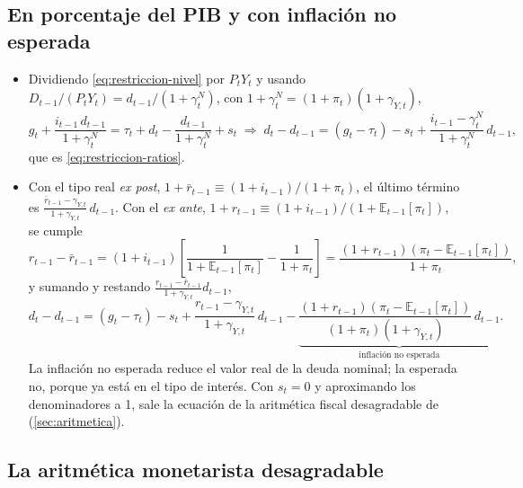 \documentclass[11pt]{article}
\begin{document}
\subsection{En porcentaje del PIB y con inflación no esperada}

\begin{itemize}
\item Dividiendo \eqref{eq:restriccion-nivel} por $P_tY_t$ y usando $D_{t-1}/(P_tY_t)=d_{t-1}/(1+\gamma^N_t)$, con $1+\gamma^N_t=(1+\pi_t)(1+\gamma_{Y,t})$,
  \begin{equation*}
  g_t+\frac{i_{t-1}\,d_{t-1}}{1+\gamma^N_t}=\tau_t+d_t-\frac{d_{t-1}}{1+\gamma^N_t}+s_t\;\Longrightarrow\;d_t-d_{t-1}=(g_t-\tau_t)-s_t+\frac{i_{t-1}-\gamma^N_t}{1+\gamma^N_t}\,d_{t-1},
  \end{equation*}
  que es \eqref{eq:restriccion-ratios}.
\item Con el tipo real \emph{ex post}, $1+\bar r_{t-1}\equiv(1+i_{t-1})/(1+\pi_t)$, el último término es $\frac{\bar r_{t-1}-\gamma_{Y,t}}{1+\gamma_{Y,t}}\,d_{t-1}$. Con el \emph{ex ante}, $1+r_{t-1}\equiv(1+i_{t-1})/(1+\mathbb{E}_{t-1}[\pi_t])$, se cumple
  \begin{equation*}
  r_{t-1}-\bar r_{t-1}=(1+i_{t-1})\left[\frac{1}{1+\mathbb{E}_{t-1}[\pi_t]}-\frac{1}{1+\pi_t}\right]=\frac{(1+r_{t-1})\left(\pi_t-\mathbb{E}_{t-1}[\pi_t]\right)}{1+\pi_t},
  \end{equation*}
  y sumando y restando $\frac{r_{t-1}-\bar r_{t-1}}{1+\gamma_{Y,t}}d_{t-1}$,
  \begin{equation}\label{eq:inflacion-sorpresa}
  d_t-d_{t-1}=(g_t-\tau_t)-s_t+\frac{r_{t-1}-\gamma_{Y,t}}{1+\gamma_{Y,t}}\,d_{t-1}-\underbrace{\frac{(1+r_{t-1})\left(\pi_t-\mathbb{E}_{t-1}[\pi_t]\right)}{(1+\pi_t)(1+\gamma_{Y,t})}\,d_{t-1}}_{\text{inflación no esperada}} .
  \end{equation}
  La inflación no esperada reduce el valor real de la deuda nominal; la esperada no, porque ya está en el tipo de interés. Con $s_t=0$ y aproximando los denominadores a 1, sale la ecuación de la aritmética fiscal desagradable de  (\ref{sec:aritmetica}).\findemo
\end{itemize}

\subsection{La aritmética monetarista desagradable}
\end{document}

